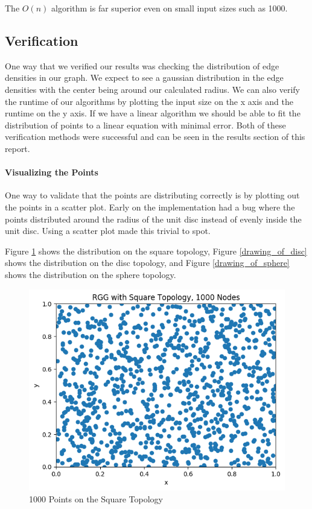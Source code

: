 \documentclass{article}
\begin{document}
	  The $O(n)$ algorithm is far superior even on small input sizes such as 1000.
	\subsection{Verification}
		One way that we verified our results was checking the distribution of edge densities in our graph.
		We expect to see a gaussian distribution in the edge densities with the center being around our calculated radius.
		We can also verify the runtime of our algorithms by plotting the input size on the x axis and the runtime on the y axis.
		If we have a linear algorithm we should be able to fit the distribution of points to a linear equation with minimal error.
		Both of these verification methods were successful and can be seen in the results section of this report.

  \paragraph{Visualizing the Points}
    One way to validate that the points are distributing correctly is by plotting out the points in a scatter plot.
    Early on the implementation had a bug where the points distributed around the radius of the unit disc instead of evenly inside the unit disc.
    Using a scatter plot made this trivial to spot.

    Figure \ref{drawing_of_square} shows the distribution on the square topology,
    Figure \ref{drawing_of_disc} shows the distribution on the disc topology,
    and Figure \ref{drawing_of_sphere} shows the distribution on the sphere topology.
    \begin{figure}
      \label{drawing_of_square}
      \includegraphics[width=1 \textwidth]{square/drawing/nodes.png}
      \caption{1000 Points on the Square Topology}
    \end{figure}
\end{document}
